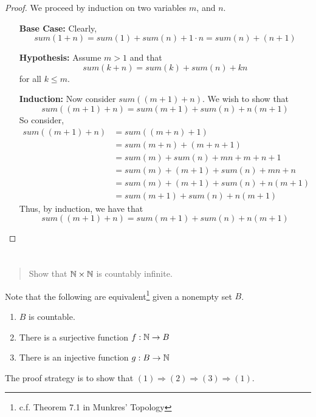 \documentclass{article}
\begin{document}
\begin{proof}
    We proceed by induction on two variables $m$, and $n$.
    \begin{itemize}
        \item[\textbf{Base Case:}] Clearly,
              \[sum(1 + n) = sum(1) + sum(n) + 1 \cdot n = sum(n) + (n + 1)\]
        \item[\textbf{Hypothesis:}] Assume $m > 1$ and that
              \[sum(k + n) = sum(k) + sum(n) + kn\]
              for all $k \leq m$.
        \item[\textbf{Induction:}] Now consider $sum((m + 1) + n)$. We wish to show that
              \[sum((m + 1) + n) = sum(m + 1) + sum(n) + n(m + 1)\]
              So consider,
              \begin{align*}
                  sum((m + 1) + n) & = sum((m + n) + 1)                     \\
                                   & = sum(m + n) + (m + n + 1)             \\
                                   & = sum(m) + sum(n) + mn + m + n + 1     \\
                                   & = sum(m) + (m + 1) + sum(n) + mn + n   \\
                                   & = sum(m) + (m + 1) + sum(n) + n(m + 1) \\
                                   & = sum(m + 1) + sum(n) + n(m + 1)
              \end{align*}
              Thus, by induction, we have that
              \[sum((m + 1) + n) = sum(m + 1) + sum(n) + n(m + 1)\]
    \end{itemize}
\end{proof}

\section{}
\begin{quote}
    Show that $\mathbb{N} \times \mathbb{N}$ is countably infinite.
\end{quote}

Note that the following are equivalent\footnote{c.f. Theorem 7.1 in Munkres' Topology} given a
nonempty set $B$.
\begin{enumerate}
    \item $B$ is countable.
    \item There is a surjective function $f : \mathbb{N} \to B$
    \item There is an injective function $g : B \to \mathbb{N}$
\end{enumerate}
The proof strategy is to show that $(1) \Rightarrow (2) \Rightarrow (3) \Rightarrow (1)$.
\end{document}

